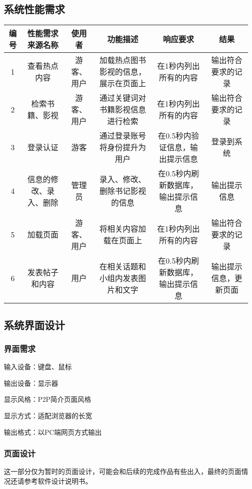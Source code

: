 \documentclass[
]{article}
\begin{document}
\hypertarget{header-n1230}{%
\subsection{系统性能需求}\label{header-n1230}}

\begin{longtable}[]{@{}cccccc@{}}
\toprule
编号 & 性能需求来源名称 & 使用者 & 功能描述 & 响应要求 &
结果\tabularnewline
\midrule
\endhead
1 & 查看热点内容 & 游客、用户 & 加载热点图书影视的信息，展示在页面上 &
在1秒内列出所有的内容 & 输出符合要求的记录\tabularnewline
2 & 检索书籍、影视 & 游客、用户 & 通过关键词对书籍影视信息进行检索 &
在1秒内列出所有的内容 & 输出符合要求的记录\tabularnewline
3 & 登录认证 & 游客 & 通过登录账号将身份提升为用户 &
在0.5秒内验证信息，输出提示信息 & 登录到系统\tabularnewline
4 & 信息的修改、录入、删除 & 管理员 & 录入、修改、删除书记影视的信息 &
在0.5秒内刷新数据库，输出提示信息 & 输出提示信息\tabularnewline
5 & 加载页面 & 游客、用户 & 将相关内容加载在页面上 &
在1秒内列出所有的内容 & 输出符合要求的记录\tabularnewline
6 & 发表帖子和内容 & 用户 & 在相关话题和小组内发表图片和文字 &
在0.5秒内刷新数据库，输出提示信息 &
输出提示信息，更新页面\tabularnewline
\bottomrule
\end{longtable}

\hypertarget{header-n1282}{%
\subsection{系统界面设计}\label{header-n1282}}

\hypertarget{header-n1283}{%
\subsubsection{界面需求}\label{header-n1283}}

输入设备：键盘、鼠标

输出设备：显示器

显示风格：P2P简介页面风格

显示方式：适配浏览器的长宽

输出格式：以PC端网页方式输出

\hypertarget{header-n1289}{%
\subsubsection{页面设计}\label{header-n1289}}

这一部分仅为暂时的页面设计，可能会和后续的完成作品有些出入，最终的页面情况还请参考软件设计说明书。
\end{document}
